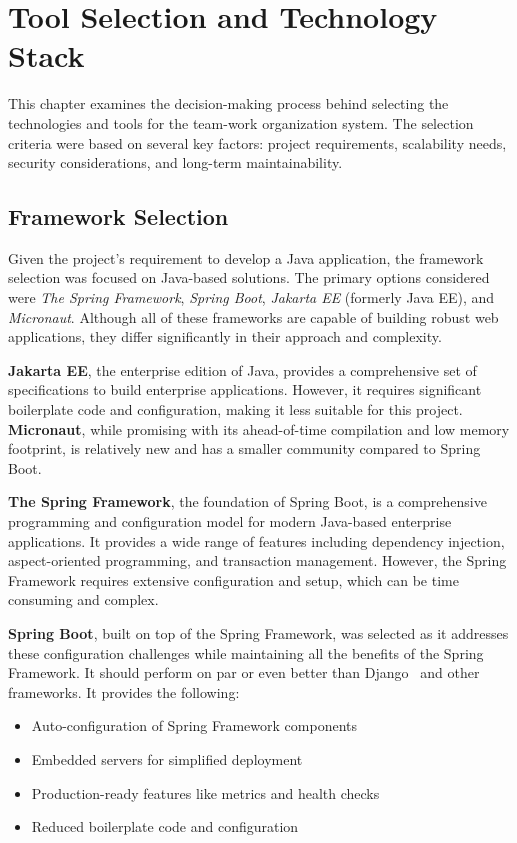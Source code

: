 \section{Tool Selection and Technology Stack}\label{sec:tools}

This chapter examines the decision-making process behind selecting the technologies and tools for the team-work organization system.
The selection criteria were based on several key factors: project requirements, scalability needs, security considerations, and long-term maintainability.

\subsection{Framework Selection}\label{subsec:framework-selection}

Given the project's requirement to develop a Java application, the framework selection was focused on Java-based solutions.
The primary options considered were \textit{The Spring Framework}, \textit{Spring Boot},  \textit{Jakarta EE} (formerly Java EE), and \textit{Micronaut}.
Although all of these frameworks are capable of building robust web applications, they differ significantly in their approach and complexity.

\textbf{Jakarta EE}, the enterprise edition of Java, provides a comprehensive set of specifications to build enterprise applications.
However, it requires significant boilerplate code and configuration, making it less suitable for this project.
\textbf{Micronaut}, while promising with its ahead-of-time compilation and low memory footprint, is relatively new and has a smaller community compared to Spring Boot.

\textbf{The Spring Framework}, the foundation of Spring Boot, is a comprehensive programming and configuration model for modern Java-based enterprise applications.
It provides a wide range of features including dependency injection, aspect-oriented programming, and transaction management.
However, the Spring Framework requires extensive configuration and setup, which can be time consuming and complex.

\textbf{Spring Boot}, built on top of the Spring Framework, was selected as it addresses these configuration challenges while maintaining all the benefits of the Spring Framework.
It should perform on par or even better than Django~\cite{ShreyashVardhan2024} and other frameworks.
It provides the following:
\begin{itemize}
    \item Auto-configuration of Spring Framework components
    \item Embedded servers for simplified deployment
    \item Production-ready features like metrics and health checks
    \item Reduced boilerplate code and configuration
\end{itemize}

